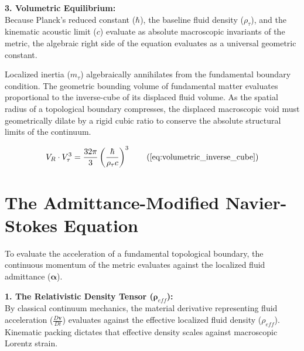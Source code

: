 \documentclass[11pt, a4paper]{article}
\begin{document}
\textbf{3. Volumetric Equilibrium:} \\
Because Planck's reduced constant ($\hbar$), the baseline fluid density ($\rho_{\tau}$), and the kinematic acoustic limit ($c$) evaluate as absolute macroscopic invariants of the metric, the algebraic right side of the equation evaluates as a universal geometric constant. 

Localized inertia ($m_\tau$) algebraically annihilates from the fundamental boundary condition. The geometric bounding volume of fundamental matter evaluates proportional to the inverse-cube of its displaced fluid volume. As the spatial radius of a topological boundary compresses, the displaced macroscopic void must geometrically dilate by a rigid cubic ratio to conserve the absolute structural limits of the continuum.

\begin{tcolorbox}[recallbox, title={\ref{box:volumetric_inverse_cube}. The Volumetric Inverse-Cube Identity}]
\begin{equation}
    V_R \cdot V_{\tau}^3 = \frac{32\pi}{3} \left( \frac{\hbar}{\rho_{\tau} c} \right)^3 \tag{\ref{eq:volumetric_inverse_cube}}
\end{equation}
\end{tcolorbox}



\section{The Admittance-Modified Navier-Stokes Equation}
\label{sec:deriv_admittance_ns}

To evaluate the acceleration of a fundamental topological boundary, the continuous momentum of the metric evaluates against the localized fluid admittance ($\boldsymbol{\alpha}$). 

\textbf{1. The Relativistic Density Tensor ($\boldsymbol{\rho}_{eff}$):} \\
By classical continuum mechanics, the material derivative representing fluid acceleration ($\frac{D\mathbf{v}}{Dt}$) evaluates against the effective localized fluid density ($\rho_{eff}$). Kinematic packing dictates that effective density scales against macroscopic Lorentz strain.
\end{document}
